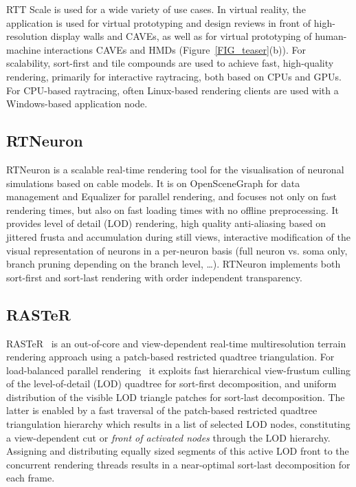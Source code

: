 \documentclass[10pt,journal,compsoc]{IEEEtran}
\newcommand{\fig}[1]{Figure~\ref{#1}}
\begin{document}
RTT Scale is used for a wide variety of use cases. In virtual reality, the
application is used for virtual prototyping and design reviews in front of
high-resolution display walls and CAVEs, as well as for virtual prototyping of
human-machine interactions CAVEs and HMDs (\fig{FIG_teaser}(b)). For
scalability, sort-first and tile compounds are used to achieve fast,
high-quality rendering, primarily for interactive raytracing, both based on CPUs
and GPUs. For CPU-based raytracing, often Linux-based rendering clients are used
with a Windows-based application node.

\subsection{RTNeuron}

RTNeuron \cite{HBBES:13} is a scalable real-time rendering tool for the
visualisation of neuronal simulations based on cable models. It is on
OpenSceneGraph for data management and Equalizer for parallel rendering, and
focuses not only on fast rendering times, but also on fast loading times with no
offline preprocessing. It provides level of detail (LOD) rendering, high quality
anti-aliasing based on jittered frusta and accumulation during still views,
interactive modification of the visual representation of neurons in a per-neuron
basis (full neuron vs. soma only, branch pruning depending on the branch level,
\dots). RTNeuron implements both sort-first and sort-last rendering with order
independent transparency.

\subsection{RASTeR}

RASTeR~\cite{BGP:09} is an out-of-core and view-dependent real-time multiresolution
terrain rendering approach using a patch-based restricted quadtree triangulation.
For load-balanced parallel rendering~\cite{GMBP:10} it exploits fast hierarchical
view-frustum culling of the level-of-detail (LOD) quadtree for sort-first decomposition, and
uniform distribution of the visible LOD triangle patches for sort-last decomposition.
The latter is enabled by a fast traversal of the patch-based restricted quadtree
triangulation hierarchy which results in a list of selected LOD nodes,
constituting a view-dependent cut or \emph{front of activated nodes} through the LOD hierarchy.
Assigning and distributing equally sized segments of this active LOD front to the concurrent
rendering threads results in a near-optimal sort-last decomposition for each frame.
\end{document}
